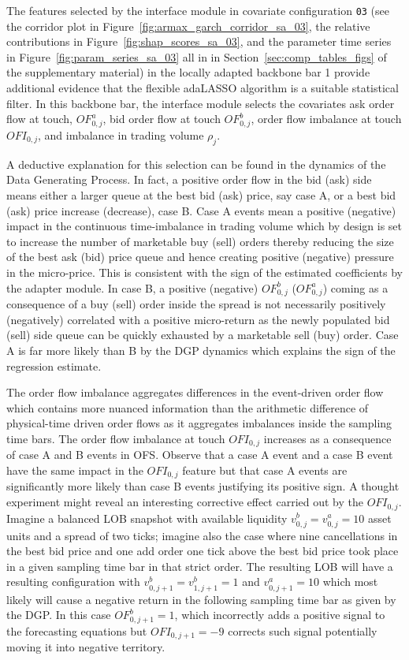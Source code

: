 \documentclass[10pt,a4paper,oneside]{article}
\begin{document}
The features selected by the interface module in covariate configuration \verb|03| (see the corridor plot in Figure~\ref{fig:armax_garch_corridor_sa_03}, the relative contributions in Figure~\ref{fig:shap_scores_sa_03}, and the parameter time series in Figure~\ref{fig:param_series_sa_03} all in in Section~\ref{sec:comp_tables_figs} of the supplementary material) in the locally adapted backbone bar 1 provide additional evidence that the flexible adaLASSO algorithm is a suitable statistical filter. In this backbone bar, the interface module selects the covariates ask order flow at touch, $OF^{a}_{0,j}$, bid order flow at touch $OF^b_{0, j}$, order flow imbalance at touch $OFI_{0,j}$, and imbalance in trading volume $\rho_j$.

A deductive explanation for this selection can be found in the dynamics of the Data Generating Process. In fact, a positive order flow in the bid (ask) side means either a larger queue at the best bid (ask) price, say case A, or a best bid (ask) price increase (decrease), case B. Case A events mean a positive (negative) impact in the continuous time-imbalance in trading volume which by design is set to increase the number of marketable buy (sell) orders thereby reducing the size of the best ask (bid) price queue and hence creating positive (negative) pressure in the micro-price. This is consistent with the sign of the estimated coefficients by the adapter module. In case B, a positive (negative) $OF^{b}_{0, j}$ ($OF^a_{0, j}$) coming as a consequence of a buy (sell) order inside the spread is not necessarily positively (negatively) correlated with a positive micro-return as the newly populated bid (sell) side queue can be quickly exhausted by a marketable sell (buy) order. Case A is far more likely than B by the DGP dynamics which explains the sign of the regression estimate.

The order flow imbalance aggregates differences in the event-driven order flow which contains more nuanced information than the arithmetic difference of physical-time driven order flows as it aggregates imbalances inside the sampling time bars. The order flow imbalance at touch $OFI_{0,j}$ increases as a consequence of case A and B events in OFS. Observe that a case A event and a case B event have the same impact in the $OFI_{0,j}$ feature but that case A events are significantly more likely than case B events justifying its positive sign. A thought experiment might reveal an interesting corrective effect carried out by the $OFI_{0,j}$. Imagine a balanced LOB snapshot with available liquidity $v^{b}_{0, j} = v^a_{0,j} = 10$  asset units and a spread of two ticks; imagine also the case where nine cancellations in the best bid price and one add order one tick above the best bid price took place in a given sampling time bar in that strict order. The resulting LOB will have a resulting configuration with $v^{b}_{0,j + 1} = v^{b}_{1,j + 1} = 1$ and $v^{a}_{0,j + 1} = 10$ which most likely will cause a negative return in the following sampling time bar as given by the DGP. In this case $OF^{b}_{0, j+1} = 1$, which incorrectly adds a positive signal to the forecasting equations but $OFI_{0, j + 1} = -9$ corrects such signal potentially moving it into negative territory.
\end{document}
